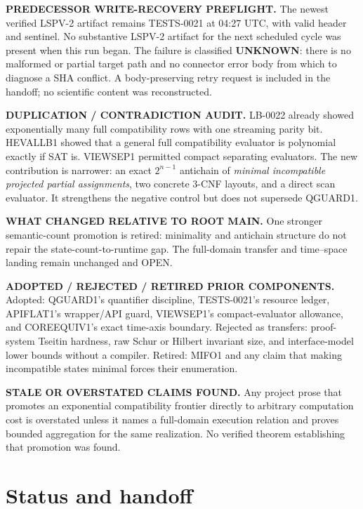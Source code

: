 \documentclass[11pt]{article}
\begin{document}
\textbf{PREDECESSOR WRITE-RECOVERY PREFLIGHT.}  The newest verified LSPV-2
artifact remains TESTS-0021 at 04:27 UTC, with valid header and sentinel.  No
substantive LSPV-2 artifact for the next scheduled cycle was present when this
run began.  The failure is classified \textbf{UNKNOWN}: there is no malformed
or partial target path and no connector error body from which to diagnose a
SHA conflict.  A body-preserving retry request is included in the handoff; no
scientific content was reconstructed.

\textbf{DUPLICATION / CONTRADICTION AUDIT.}  LB-0022 already showed exponentially
many full compatibility rows with one streaming parity bit.  HEVALLB1 showed
that a general full compatibility evaluator is polynomial exactly if SAT is.
VIEWSEP1 permitted compact separating evaluators.  The new contribution is
narrower: an exact $2^{n-1}$ antichain of \emph{minimal incompatible projected
partial assignments}, two concrete 3-CNF layouts, and a direct scan evaluator.
It strengthens the negative control but does not supersede QGUARD1.

\textbf{WHAT CHANGED RELATIVE TO ROOT MAIN.}  One stronger semantic-count
promotion is retired: minimality and antichain structure do not repair the
state-count-to-runtime gap.  The full-domain transfer and time--space landing
remain unchanged and OPEN.

\textbf{ADOPTED / REJECTED / RETIRED PRIOR COMPONENTS.}  Adopted: QGUARD1's
quantifier discipline, TESTS-0021's resource ledger, APIFLAT1's wrapper/API
guard, VIEWSEP1's compact-evaluator allowance, and COREEQUIV1's exact time-axis
boundary.  Rejected as transfers: proof-system Tseitin hardness, raw Schur or
Hilbert invariant size, and interface-model lower bounds without a compiler.
Retired: MIFO1 and any claim that making incompatible states minimal forces
their enumeration.

\textbf{STALE OR OVERSTATED CLAIMS FOUND.}  Any project prose that promotes an
exponential compatibility frontier directly to arbitrary computation cost is
overstated unless it names a full-domain execution relation and proves bounded
aggregation for the same realization.  No verified theorem establishing that
promotion was found.

\section{Status and handoff}
\end{document}
